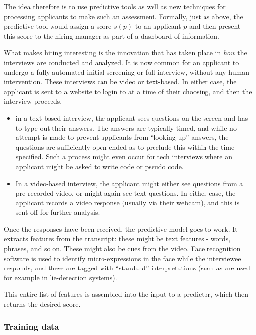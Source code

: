 \documentclass[11pt]{paper}
\begin{document}
The idea therefore is to use predictive tools as well as new techniques
for processing applicants to make such an assessment. Formally, just as
above, the predictive tool would assign a score $s(p)$ to an applicant
$p$ and then present this score to the hiring manager as part of a
dashboard of information.

What makes hiring interesting is the innovation that has taken place in
\emph{how} the interviews are conducted and analyzed. It is now common
for an applicant to undergo a fully automated initial screening or full
interview, without any human intervention. These interviews can be video
or text-based. In either case, the applicant is sent to a website to
login to at a time of their choosing, and then the interview proceeds.

\begin{itemize}
\itemsep1pt\parskip0pt
\item
  in a text-based interview, the applicant sees questions on the screen
  and has to type out their answers. The answers are typically timed,
  and while no attempt is made to prevent applicants from ``looking up''
  answers, the questions are sufficiently open-ended as to preclude this
  within the time specified. Such a process might even occur for tech
  interviews where an applicant might be asked to write code or pseudo
  code.
\item
  In a video-based interview, the applicant might either see questions
  from a pre-recorded video, or might again see text questions. In
  either case, the applicant records a video response (usually via their
  webcam), and this is sent off for further analysis.
\end{itemize}

Once the responses have been received, the predictive model goes to
work. It extracts features from the transcript: these might be text
features - words, phrases, and so on. These might also be cues from the
video. Face recognition software is used to identify micro-expressions
in the face while the interviewee responds, and these are tagged with
``standard'' interpretations (such as are used for example in
lie-detection systems).

This entire list of features is assembled into the input to a predictor,
which then returns the desired score.

\subsubsection{Training data}\label{training-data-2}
\end{document}

